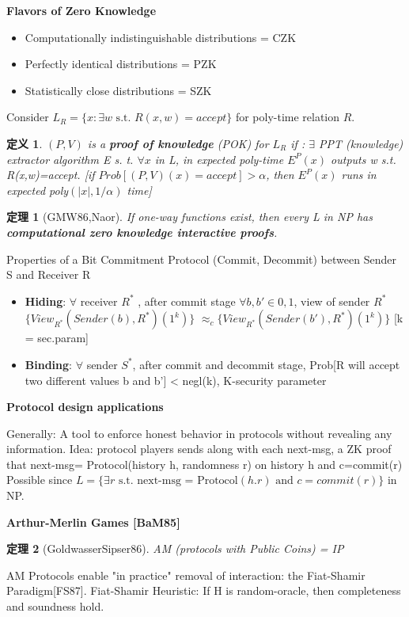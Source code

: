\documentclass[10pt]{ctexart}
\newtheorem{definition}{定义}
\newtheorem{theorem}{定理}
\begin{document}
\textbf{Flavors of Zero Knowledge}
\begin{itemize}
	\item Computationally indistinguishable distributions = CZK
	\item Perfectly identical distributions = PZK
	\item Statistically close distributions = SZK
\end{itemize}

Consider $L_R=\{x: \exists w \text{ s.t. }  R(x,w)= accept \}$ for poly-time relation $R$.
\begin{definition}
	$(P,V)$ is a \textbf{proof of knowledge} (POK) for $L_R$ if :
	$\exists$ PPT (knowledge) extractor algorithm E s. t. $\forall x$ in L,
	in expected poly-time $E^P(x)$ outputs w s.t. R(x,w)=accept. {\color{blue}[if $Prob[(P,V)(x)=accept] > \alpha$, then $E^P(x)$ runs in expected poly$(|x|,1/ \alpha)$ time]}
\end{definition}

\begin{theorem}[GMW86,Naor]
	If one-way functions exist, then every L in NP has \textbf{computational zero knowledge interactive proofs}.
\end{theorem}

Properties of a Bit Commitment Protocol (Commit, Decommit) between Sender S and Receiver R
\begin{itemize}
	\item \textbf{Hiding}: $\forall$ receiver $R^*$ , after {\color{blue} commit} stage $\forall b, b' \in {0,1}$, view of sender $R^*$ $\{ View_{R^*}(Sender(b),R^*)(1^k)\}$ $ \approx_c  \{ View_{R^*}(Sender(b'),R^*)(1^k)\}$ [k = sec.param]
	\item \textbf{Binding}: $\forall$ sender $S^*$, after {\color{blue} commit} and {\color{blue} decommit stage}, Prob[R will accept two different values b and b’] < negl(k), K-security parameter
\end{itemize}

\textbf{Protocol design applications}

Generally: A tool to enforce honest behavior {\color{violet}in protocols} without revealing any information. Idea: protocol players sends along with each next-msg, a ZK proof that next-msg= Protocol(history h, randomness r) on history h and c=commit(r) Possible since {\color{violet}$L=\{\exists r \text{ s.t. next-msg = Protocol}(h.r) \text{ and } c = commit(r)\}$} in NP.

\textbf{Arthur-Merlin Games [BaM85]}
\begin{theorem}[GoldwasserSipser86]
	AM (protocols with Public Coins) = IP
\end{theorem}
AM Protocols enable "in practice" removal of interaction: the Fiat-Shamir Paradigm[FS87].
Fiat-Shamir Heuristic:
If H is random-oracle, then completeness and soundness hold.
\end{document}

